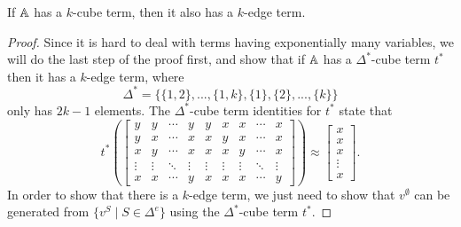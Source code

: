 \documentclass[letterpaper,11pt]{article}
\begin{document}
\begin{thm}\label{cube-edge} If $\mathbb{A}$ has a $k$-cube term, then it also has a $k$-edge term.
\end{thm}
\begin{proof} Since it is hard to deal with terms having exponentially many variables, we will do the last step of the proof first, and show that if $\mathbb{A}$ has a $\Delta^*$-cube term $t^*$ then it has a $k$-edge term, where
\[
\Delta^* = \{\{1,2\}, ..., \{1,k\}, \{1\}, \{2\}, ..., \{k\}\}
\]
only has $2k-1$ elements. The $\Delta^*$-cube term identities for $t^*$ state that
\[
t^*\left(\begin{bmatrix} y & y & \cdots & y & y & x & x & \cdots & x\\ y & x & \cdots & x & x & y & x & \cdots & x\\ x & y & \cdots & x & x & x & y & \cdots & x\\ \vdots & \vdots & \ddots & \vdots & \vdots & \vdots & \vdots & \ddots & \vdots \\ x & x & \cdots & y & x & x & x & \cdots & y \end{bmatrix}\right) \approx \begin{bmatrix}x\\ x\\ x\\ \vdots \\ x\end{bmatrix}.
\]
In order to show that there is a $k$-edge term, we just need to show that $v^\emptyset$ can be generated from $\{v^S \mid S \in \Delta^e\}$ using the $\Delta^*$-cube term $t^*$.


\end{proof}
\end{document}
